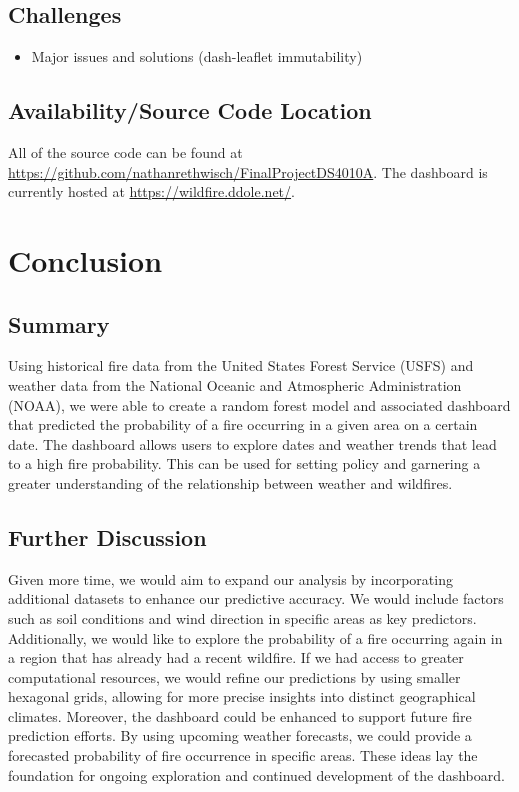 \documentclass[
  12pt,
  letterpaper,
  DIV=11,
  numbers=noendperiod]{scrartcl}
\providecommand{\tightlist}{%
  \setlength{\itemsep}{0pt}\setlength{\parskip}{0pt}}\usepackage{longtable,booktabs,array}
\begin{document}
\subsection{Challenges}\label{challenges-1}

\begin{itemize}
\tightlist
\item
  Major issues and solutions (dash-leaflet immutability)
\end{itemize}

\subsection{Availability/Source Code
Location}\label{availabilitysource-code-location}

All of the source code can be found at
\url{https://github.com/nathanrethwisch/FinalProjectDS4010A}. The
dashboard is currently hosted at \url{https://wildfire.ddole.net/}.

\section{Conclusion}\label{conclusion}

\subsection{Summary}\label{summary}

Using historical fire data from the United States Forest Service (USFS)
and weather data from the National Oceanic and Atmospheric
Administration (NOAA), we were able to create a random forest model and
associated dashboard that predicted the probability of a fire occurring
in a given area on a certain date. The dashboard allows users to explore
dates and weather trends that lead to a high fire probability. This can
be used for setting policy and garnering a greater understanding of the
relationship between weather and wildfires.

\subsection{Further Discussion}\label{further-discussion}

Given more time, we would aim to expand our analysis by incorporating
additional datasets to enhance our predictive accuracy. We would include
factors such as soil conditions and wind direction in specific areas as
key predictors. Additionally, we would like to explore the probability
of a fire occurring again in a region that has already had a recent
wildfire. If we had access to greater computational resources, we would
refine our predictions by using smaller hexagonal grids, allowing for
more precise insights into distinct geographical climates. Moreover, the
dashboard could be enhanced to support future fire prediction efforts.
By using upcoming weather forecasts, we could provide a forecasted
probability of fire occurrence in specific areas. These ideas lay the
foundation for ongoing exploration and continued development of the
dashboard.
\end{document}
